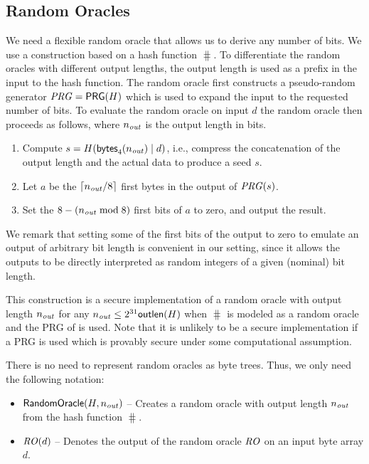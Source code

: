\documentclass[11pt]{article}
\begin{document}
\subsection{Random Oracles}\label{sect:randomoracle}

We need a flexible random oracle that allows us to derive any number
of bits. We use a construction based on a hash function $\hash$. To
differentiate the random oracles with different output lengths, the
output length is used as a prefix in the input to the hash
function. The random oracle first constructs a pseudo-random generator
$\mathit{PRG}=\textsf{PRG}(H)$ which is used to expand the input to the requested
number of bits. To evaluate the random oracle on input $d$ the random
oracle then proceeds as follows, where $n_{\mathit{out}}$ is the
output length in bits.
\begin{enumerate}

\item Compute $s=H(\textsf{bytes}_{4}(n_{\mathit{out}})\mid d)$, i.e.,
  compress the concatenation of the output length and the actual data
  to produce a seed $s$.

\item Let $a$ be the $\lceil n_{\mathit{out}}/8\rceil$ first
  bytes in the output of $\mathit{PRG}(s)$.

\item Set the $8-(n_{\mathit{out}}\bmod 8)$ first bits of $a$ to
  zero, and output the result.

\end{enumerate}
We remark that setting some of the first bits of the output to zero to
emulate an output of arbitrary bit length is convenient in our
setting, since it allows the outputs to be directly interpreted as
random integers of a given (nominal) bit length.

This construction is a secure implementation of a random oracle with
output length $n_{\mathit{out}}$ for any $n_{\mathit{out}}\leq
2^{31}\textsf{outlen}(H)$ when $\hash$ is modeled as a random oracle and
the PRG of  is used. Note that it is unlikely to be a secure
implementation if a PRG is used which is provably secure under some
computational assumption.

There is no need to represent random oracles as byte trees. Thus, we
only need the following notation:
\begin{itemize}

\item$\textsf{RandomOracle}(H,n_{\mathit{out}})$ -- Creates a random
  oracle with output length $n_{\mathit{out}}$ from the hash
  function $\hash$.

\item$\mathit{RO}(d)$ -- Denotes the output of the random oracle $\mathit{RO}$ on
  an input byte array $d$.
 
\end{itemize}
\end{document}
